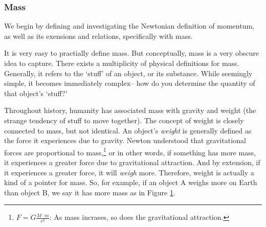 \documentclass{article}
\begin{document}
            \subsubsection{Mass}
                We begin by defining and investigating the Newtonian definition of momentum, as well as its exensions and relations, specifically with mass. 
                \par
                It is very easy to practially define mass. But conceptually, mass is a very obscure idea to capture.
                There exists a multiplicity of physical definitions for mass. Generally, it refers to the `stuff' of an object, or its substance. While seemingly simple, it becomes immediately complex-- how do you determine the quantity of that object's `stuff?' 
                \par
                Throughout history, humanity has associated mass with gravity and weight (the strange tendency of stuff to move together). The concept of weight is closely connected to mass, but not identical. 
                An object's \textit{weight} is generally defined as the force it experiences due to gravity. Newton understood that gravitational forces are proportional to mass,\footnote{$F = G\tfrac{M \cdot m}{r^2}$: As mass incrases, so does the gravitational attraction.}
                or in other words, if something has more mass, it experiences a greater force due to gravitational attraction.
                And by extension, if it experiences a greater force, it will \textit{weigh} more. Therefore, weight is actually a kind of a pointer for mass. 
                So, for example, if an object A weighs more on Earth than object B, we say it has more mass as in Figure \ref{fig:weigh}.
                
                \begin{figure}[H]
                    \centering 
                    \caption{} \label{fig:weigh}
                \end{figure} 
            
\end{document}

